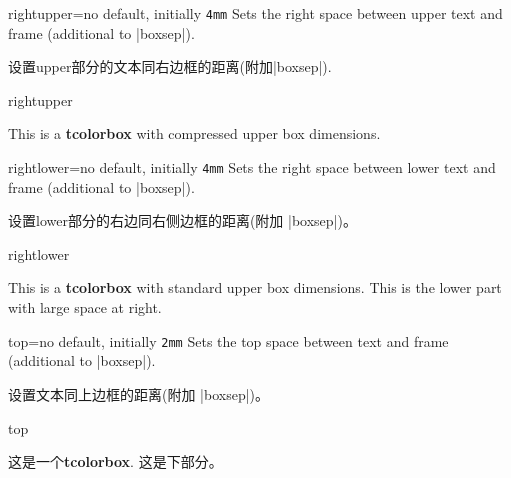 \begin{docTcbKey}{rightupper}{=}{no default, initially \texttt{4mm}}
  Sets the right space between upper text and frame (additional to |boxsep|).

设置upper部分的文本同右边框的距离(附加|boxsep|).
\begin{exdispExample}{rightupper}

\begin{tcolorbox}[width=5cm,rightupper=2cm,title=My very long title text]
This is a \textbf{tcolorbox} with compressed upper box dimensions.
\end{tcolorbox}
\end{exdispExample}
\end{docTcbKey}





\begin{docTcbKey}{rightlower}{=}{no default, initially \texttt{4mm}}
  Sets the right space between lower text and frame (additional to |boxsep|).

设置lower部分的右边同右侧边框的距离(附加 |boxsep|)。
\begin{exdispExample}{rightlower}

\begin{tcolorbox}[width=5cm,rightlower=2cm]
This is a \textbf{tcolorbox} with standard upper box dimensions.
\tcblower
This is the lower part with large space at right.
\end{tcolorbox}
\end{exdispExample}
\end{docTcbKey}



\begin{docTcbKey}{top}{=}{no default, initially \texttt{2mm}}
  Sets the top space between text and frame (additional to |boxsep|).

设置文本同上边框的距离(附加 |boxsep|)。
\begin{exdispExample}{top}

\begin{tcolorbox}[top=0mm]
这是一个\textbf{tcolorbox}.
\tcblower
这是下部分。
\end{tcolorbox}
\end{exdispExample}
\end{docTcbKey}


